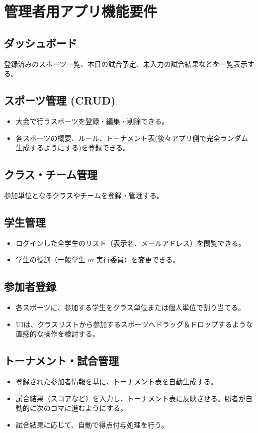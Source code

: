 \documentclass[12pt]{ltjsarticle} %
\begin{document}
\section{管理者用アプリ機能要件}

\subsection{ダッシュボード}
登録済みのスポーツ一覧、本日の試合予定、未入力の試合結果などを一覧表示する。

\subsection{スポーツ管理 (CRUD)}
\begin{itemize}
    \item 大会で行うスポーツを登録・編集・削除できる。
    \item 各スポーツの概要、ルール、トーナメント表(後々アプリ側で完全ランダム生成するようにする)を登録できる。
\end{itemize}

\subsection{クラス・チーム管理}
参加単位となるクラスやチームを登録・管理する。

\subsection{学生管理}
\begin{itemize}
    \item ログインした全学生のリスト（表示名、メールアドレス）を閲覧できる。
    \item 学生の役割（一般学生 or 実行委員）を変更できる。
\end{itemize}

\subsection{参加者登録}
\begin{itemize}
    \item 各スポーツに、参加する学生をクラス単位または個人単位で割り当てる。
    \item UIは、クラスリストから参加するスポーツへドラッグ＆ドロップするような直感的な操作を検討する。
\end{itemize}

\subsection{トーナメント・試合管理}
\begin{itemize}
    \item 登録された参加者情報を基に、トーナメント表を自動生成する。
    \item 試合結果（スコアなど）を入力し、トーナメント表に反映させる。勝者が自動的に次のコマに進むようにする。
    \item 試合結果に応じて、自動で得点付与処理を行う。
\end{itemize}
\end{document}
